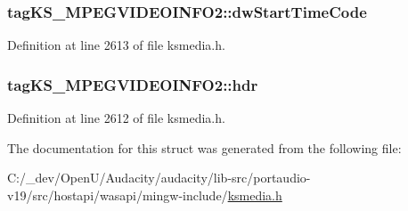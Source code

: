\subsubsection[{\texorpdfstring{dw\+Start\+Time\+Code}{dwStartTimeCode}}]{ tag\+K\+S\+\_\+\+M\+P\+E\+G\+V\+I\+D\+E\+O\+I\+N\+F\+O2\+::dw\+Start\+Time\+Code}\hypertarget{structtag_k_s___m_p_e_g_v_i_d_e_o_i_n_f_o2_a32728084569145ba827e21a08a25eb84}{}\label{structtag_k_s___m_p_e_g_v_i_d_e_o_i_n_f_o2_a32728084569145ba827e21a08a25eb84}


Definition at line 2613 of file ksmedia.\+h.

\subsubsection[{\texorpdfstring{hdr}{hdr}}]{ tag\+K\+S\+\_\+\+M\+P\+E\+G\+V\+I\+D\+E\+O\+I\+N\+F\+O2\+::hdr}\hypertarget{structtag_k_s___m_p_e_g_v_i_d_e_o_i_n_f_o2_adf8520071bdc29bf15cbbabef55bdaf5}{}\label{structtag_k_s___m_p_e_g_v_i_d_e_o_i_n_f_o2_adf8520071bdc29bf15cbbabef55bdaf5}


Definition at line 2612 of file ksmedia.\+h.



The documentation for this struct was generated from the following file\+:\begin{DoxyCompactItemize}
\item 
C\+:/\+\_\+dev/\+Open\+U/\+Audacity/audacity/lib-\/src/portaudio-\/v19/src/hostapi/wasapi/mingw-\/include/\hyperlink{ksmedia_8h}{ksmedia.\+h}\end{DoxyCompactItemize}
